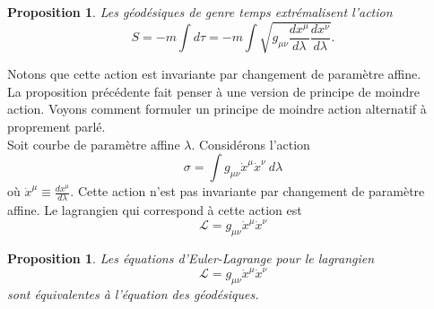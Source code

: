\documentclass[a4paper,11pt]{report}
\theoremstyle{definition}
\theoremstyle{plain}
\newtheorem{prop}[thm]{Proposition}
\theoremstyle{definition}
\theoremstyle{remark}
\begin{document}
            \begin{prop}
                Les géodésiques de genre temps extrémalisent l'action
                \begin{equation}
                    S = -m\int d\tau = -m\int \sqrt{g_{\mu\nu}\frac{dx^\mu}{d\lambda}\frac{dx^\nu}{d\lambda}}.
                \end{equation}
            \end{prop}
            
            Notons que cette action est invariante par changement de paramètre affine.\\
            
            La proposition précédente fait penser à une version de principe de moindre action. Voyons comment formuler un principe de moindre action alternatif à proprement parlé.\\
            
            Soit courbe de paramètre affine $\lambda$. Considérons l'action
            \begin{equation}
                \sigma = \int g_{\mu\nu}\dot{x}^\mu\dot{x}^\nu~d\lambda
            \end{equation}
            où $\dot{x}^\mu\equiv\frac{dx^\mu}{d\lambda}$. Cette action n'est pas invariante par changement de paramètre affine. Le lagrangien qui correspond à cette action est 
            \begin{equation}
                \mathscr{L} = g_{\mu\nu}\dot{x}^\mu\dot{x}^\nu
            \end{equation}
            
            \begin{prop}
                Les équations d'Euler-Lagrange pour le lagrangien
                \begin{equation}
                \mathscr{L} = g_{\mu\nu}\dot{x}^\mu\dot{x}^\nu
                \end{equation}
                sont équivalentes à l'équation des géodésiques.
            \end{prop}
            
\end{document}

